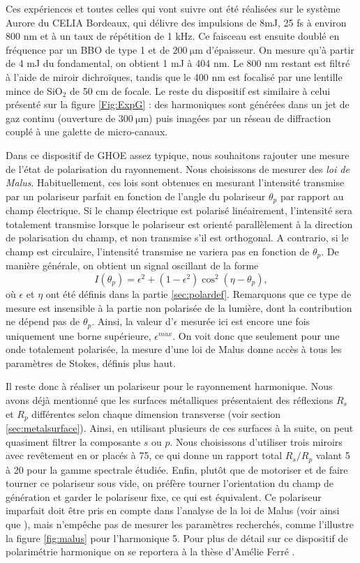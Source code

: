 Ces expériences et toutes celles qui vont suivre ont été réalisées sur le système Aurore du CELIA Bordeaux, qui délivre des impulsions de 8mJ, 25 fs à environ 800 nm et à un taux de répétition de 1 kHz. Ce faisceau est ensuite doublé en fréquence par un BBO de type 1 et de $\SI{200}{\micro\meter}$ d'épaisseur. On mesure qu'à partir de 4 mJ du fondamental, on obtient 1 mJ à 404 nm. Le 800 nm restant est filtré à l'aide de miroir dichroïques, tandis que le 400 nm est focalisé par une lentille mince de Si$\text{O}_\text{2}$ de 50 cm de focale. Le reste du dispositif est similaire à celui présenté sur la figure \ref{Fig:ExpG} : des harmoniques sont générées dans un jet de gaz continu (ouverture de $\SI{300}{\micro\meter}$) puis imagées par un réseau de diffraction couplé à une galette de micro-canaux. 

Dans ce dispositif de GHOE assez typique, nous souhaitons rajouter une mesure de l'état de polarisation du rayonnement. Nous choisissons de mesurer des \textit{loi de Malus}. Habituellement, ces lois sont obtenues en mesurant l'intensité transmise par un polariseur parfait en fonction de l'angle du polariseur $\theta_p$ par rapport au champ électrique. Si le champ électrique est polarisé linéairement, l'intensité sera totalement transmise lorsque le polariseur est orienté parallèlement à la direction de polarisation du champ, et non transmise s'il est orthogonal. A contrario, si le champ est circulaire, l'intensité transmise ne variera pas en fonction de $\theta_p$. De manière générale, on obtient un signal oscillant de la forme 
\[I(\theta_p) = \epsilon^2+(1-\epsilon^2)\cos^2(\eta-\theta_p),\]
où $\epsilon$ et $\eta$ ont été définis dans la partie \ref{sec:polardef}. Remarquons que ce type de mesure est insensible à la partie non polarisée de la lumière, dont la contribution ne dépend pas de $\theta_p$. Ainsi, la valeur d'$\epsilon$ mesurée ici est encore une fois uniquement une borne supérieure, $\epsilon^{max}$. On voit donc que seulement pour une onde totalement polarisée, la mesure d'une loi de Malus donne accès à tous les paramètres de Stokes, définis plus haut. 

Il reste donc à réaliser un polariseur pour le rayonnement harmonique. Nous avons déjà mentionné que les surfaces métalliques présentaient des réflexions $R_s$ et $R_p$ différentes selon chaque dimension transverse (voir section \ref{sec:metalsurface}). Ainsi, en utilisant plusieurs de ces surfaces à la suite, on peut quasiment filtrer la composante $s$ ou $p$. Nous choisissons d'utiliser trois miroirs avec revêtement en or placés à 75\degres, ce qui donne un rapport total $R_s/R_p$ valant 5 à 20 pour la gamme spectrale étudiée. Enfin, plutôt que de motoriser et de faire tourner ce polariseur sous vide, on préfère tourner l'orientation du champ de génération et garder le polariseur fixe, ce qui est équivalent. Ce polariseur imparfait doit être pris en compte dans l'analyse de la loi de Malus (voir  ainsi que ), mais n'empêche pas de mesurer les paramètres recherchés, comme l'illustre la figure \ref{fig:malus} pour l'harmonique 5. Pour plus de détail sur ce dispositif de polarimétrie harmonique on se reportera à la thèse d'Amélie Ferré .

